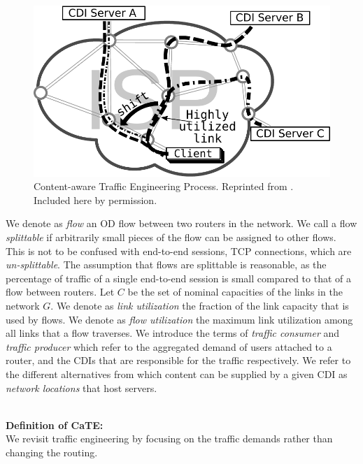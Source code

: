 \begin{figure}[tbp]
\center\includegraphics[width=0.90\linewidth]{figures-pdf/trafficShift-illustration}
\caption{Content-aware Traffic Engineering Process. Reprinted from \cite{Cate-CCR}. Included here by permission.}
\label{fig:Content-aware-illustration2}
\vspace{-1.5em}
\end{figure}


\smallskip
{}\label{sec:Terminology}
We denote as {\it flow} an OD flow between two routers in the network.  We call
a flow {\it splittable} if arbitrarily small pieces of the flow can be assigned
to other flows.  This is not to be confused with end-to-end sessions, \ie TCP
connections, which are \emph{un-splittable}.  The assumption that flows are
splittable is reasonable, as the percentage of traffic of a single end-to-end
session is small compared to that of a flow between routers. Let $C$ be the set
of nominal capacities of the links in the network $G$. We denote as {\it link
utilization} the fraction of the link capacity that is used by flows. We denote
as {\it flow utilization} the maximum link utilization among all links that a
flow traverses. We introduce the terms of {\it traffic consumer} and {\it
traffic producer} which refer to the aggregated demand of users attached to a
router, and the CDIs that are responsible for the traffic respectively. We
refer to the different alternatives from which content can be supplied by a
given CDI as \emph{network locations} that host servers.


\ \\\noindent\textbf{Definition of CaTE:}\label{sec:CaTE-Definitions}\\\noindent
We revisit traffic engineering by focusing on the traffic demands rather than
changing the routing.

